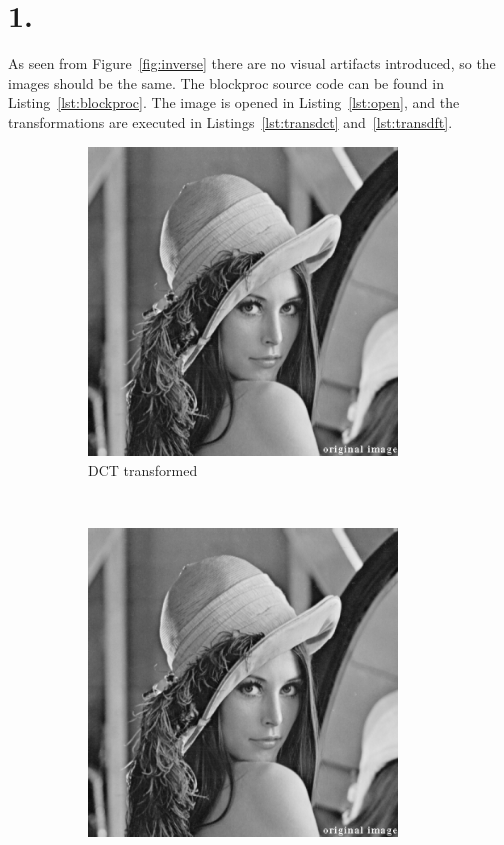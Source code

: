 \section*{1.}
As seen from Figure~\ref{fig:inverse} there are no visual artifacts introduced, so the images should be the same. The blockproc source code can be found in Listing~\ref{lst:blockproc}. The image is opened in Listing~\ref{lst:open}, and the transformations are executed in Listings~\ref{lst:transdct} and~\ref{lst:transdft}.

\begin{figure}[H]
	\centering
	\begin{subfigure}[t]{0.5\textwidth}
		\centering
		\includegraphics[width=0.9\textwidth]{transform-dct}
		\caption{DCT transformed}
	\end{subfigure}%
	~
	\begin{subfigure}[t]{0.5\textwidth}
		\centering
		\includegraphics[width=0.9\textwidth]{transform-dft}

\end{subfigure}
\end{figure}
